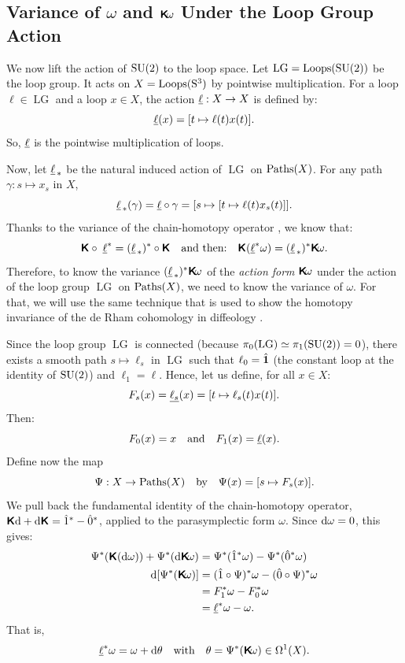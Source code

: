 \documentclass[11pt,reqno,letterpaper,twoside]{amsart}
\renewcommand{\Komega}{\CHO\!\omega}
\def\u(#1){\uline{#1}}
\newcommand{\LG}{\operatorname{LG}}
\begin{document}
  \subsection{Variance of $\omega$ and $\Komega$ Under the Loop Group Action}
  
  We now lift the action of $\mathrm{SU}(2)$ to the loop space.
  Let $\LG = \Loops(\SU(2))$ be the loop group.
  It acts on $X = \operatorname{Loops}(\mathrm{S}^3)$ by pointwise multiplication.
  For a loop $\ell \in \LG$ and a loop $x \in X$,
  the action $\u(\ell): X \to X$ is defined by:
  \[
    \u(\ell)(x) = [t \mapsto \ell(t) x(t)].
    \]
  So,
  $\u(\ell)$ is the pointwise multiplication of loops.
  
  Now,
  let $\u(\ell)_{\,*}$ be the natural induced action of $\LG$ on $\operatorname{Paths}(X)$.
  For any path $\gamma: s \mapsto x_s$ in $X$,
  \[
    {\u(\ell)}_{\,*}(\gamma) = \u(\ell) \circ \gamma = [s \mapsto [t \mapsto \ell(t) x_s(t)]].
    \]
  Thanks to the variance of the chain-homotopy operator \cite[]{PIZ13},
  we know that:
  \[
    \CHO \circ\; \u(\ell)^* = (\u(\ell)_{\,*})^* \circ \CHO
    \qtext{and then:} \CHO(\u(\ell)^*\omega) = (\u(\ell)_{\,*})^*\Komega.
    \]
  Therefore,
  to know the variance $(\u(\ell)_{\,*})^*\Komega$ of the \emph{action form} $\Komega$ under the action of the loop group $\LG$ on $\operatorname{Paths}(X)$,
  we need to know the variance of $\omega$.
  For that,
  we will use the same technique that is used to show the homotopy invariance of the de Rham cohomology in diffeology \cite[]{PIZ13}.
  
  Since the loop group $\LG$ is connected (because $\pi_0(\LG) \simeq \pi_1(\SU(2)) = 0$),
  there exists a smooth path $s \mapsto \ell_s$ in $\LG$ such that $\ell_0 = \hat {\boldsymbol{1}}$ (the constant loop at the identity of $\mathrm{SU}(2)$) and $\ell_1 = \ell$.
  Hence,
  let us define, for all $x \in X$:
  \[
    F_s(x) = \u(\ell_s)(x) = [t \mapsto \ell_s(t) x(t)].
    \]
  Then:
  \[
    F_0(x) = x \qtext{and} F_1(x) = \u(\ell)(x).
    \]
  Define now the map
  \[
    \Psi : X \to \operatorname{Paths}(X)
    \quad\text{by}\quad
    \Psi(x) = [s \mapsto F_s(x)].
    \]
  We pull back the fundamental identity of the chain-homotopy operator,
  $\boldsymbol{\mathsf{K}} \mathrm{d} + \mathrm{d} \boldsymbol{\mathsf{K}} = \hat 1^* - \hat 0^*$,
  applied to the parasymplectic form $\omega$.
  Since $\mathrm{d}\omega = 0$,
  this gives:
  \begin{align*}
    \Psi^*(\CHO(\der\omega)) + \Psi^*(\der\Komega) &= \Psi^*(\1^*\omega) - \Psi^*(\0^*\omega) \\
    \der[\Psi^*(\Komega)] &= (\1 \circ \Psi)^*\omega - (\0 \circ \Psi)^*\omega \\
    &= F_1^*\omega - F_0^*\omega \\
    &= \u(\ell)^*\omega - \omega.
  \end{align*}
  That is,
  \[
    \u(\ell)^*\omega = \omega + \der\theta
    \qtext{with} \theta = \Psi^*(\Komega) \in \Omega^1(X).
    \]
  
\end{document}

